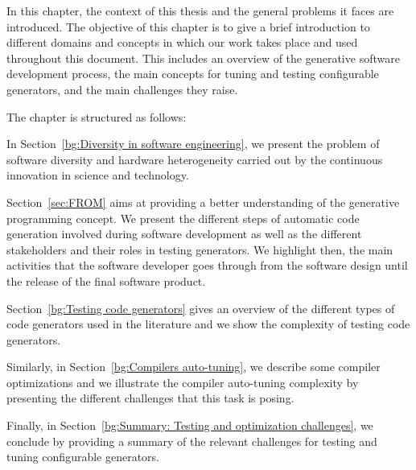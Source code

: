 
In this chapter, the context of this thesis and the general problems it faces are introduced. The objective of this chapter is to give a brief introduction to  different domains and concepts in which our work takes place and used throughout this document.
This includes an overview of the generative software development process, the main concepts for tuning and testing configurable generators, and the main challenges they raise.


The chapter is structured as follows: 

In Section~\ref{bg:Diversity in software engineering}, we present the problem of software diversity and hardware heterogeneity carried out by the continuous innovation in science and technology.

Section~\ref{sec:FROM} aims at providing a better understanding of the generative programming concept. We present the different steps of automatic code generation involved during software development as well as the different stakeholders and their roles in testing generators. We highlight then, the main activities that the software developer goes through from the software design until the release of the final software product.

Section~\ref{bg:Testing code generators} gives an overview of the different types of code generators used in the literature and we show the complexity of testing code generators.

Similarly, in Section~\ref{bg:Compilers auto-tuning}, we describe some compiler optimizations and we illustrate the compiler auto-tuning complexity by presenting the different challenges that this task is posing.

Finally, in Section~\ref{bg:Summary: Testing and optimization challenges}, we conclude by providing a summary of the relevant challenges for testing and tuning configurable generators.

